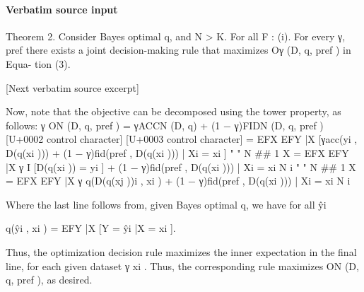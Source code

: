 \documentclass[10pt]{article}
\begin{document}
\paragraph{Verbatim source input}
\begin{ReviewVerbatim}
Theorem 2. Consider Bayes optimal q, and N > K. For all F :
   (i). For every γ, pref there exists a joint decision-making rule that maximizes Oγ (D, q, pref ) in Equa-
        tion (3).

[Next verbatim source excerpt]

   Now, note that the objective can be decomposed using the tower property, as follows:
 γ
ON (D, q, pref ) = γACCN (D, q) + (1 − γ)FIDN (D, q, pref )
                        [U+0002 control character]                                                                                     [U+0003 control character]
                 = EF{X} EF{Y }|{X} [γacc(yi , D({q(xi )})) + (1 − γ)fid(pref , D({q(xi )})) | {Xi } = {xi }]
                        "            "     N
                                                                                                                      ##
                                        1 X
                 = EF{X} EF{Y }|{X} γ          I [D({q(xi )}) = yi ] + (1 − γ)fid(pref , D({q(xi )})) | {Xi } = {xi }
                                       N i
                        "            "     N
                                                                                                                     ##
                                        1 X
                 = EF{X} EF{Y }|{X} γ          q(D({q(xj )})i , xi ) + (1 − γ)fid(pref , D({q(xi )})) | {Xi } = {xi }
                                       N i

   Where the last line follows from, given Bayes optimal q, we have for all ŷi

                                            q(ŷi , xi ) = EFY |X [Y = ŷi |X = xi ].

Thus, the optimization decision rule maximizes the inner expectation in the final line, for each given dataset
                                                γ
{xi }. Thus, the corresponding rule maximizes ON  (D, q, pref ), as desired.
\end{ReviewVerbatim}
\end{document}
